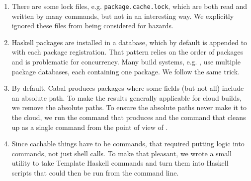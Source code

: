 \begin{enumerate}
\item There are some lock files, e.g. \texttt{package.cache.lock}, which are both read and written by many commands, but not in an interesting way. We explicitly ignored these files from being considered for hazards.
\item Haskell packages are installed in a database, which by default is appended to with each package registration. That pattern relies on the order of packages and is problematic for concurrency. Many build systems, e.g. \Bazel, use multiple package databases, each containing one package. We follow the same trick.
\item By default, Cabal produces packages where some fields (but not all) include an absolute path. To make the results generally applicable for cloud builds, we remove the absolute paths. To ensure the absolute paths never make it to the cloud, we run the command that produces and the command that cleans up as a single command from the point of view of \Rattle.
\item Since cachable things have to be commands, that required putting logic into commands, not just shell calls. To make that pleasant, we wrote a small utility to take Template Haskell commands \cite{template_haskell} and turn them into Haskell scripts that could then be run from the command line.
\end{enumerate}
